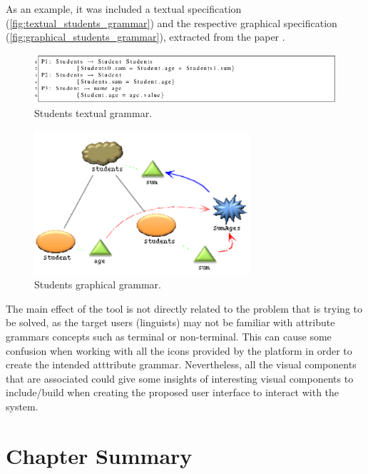 As an example, it was included a textual specification (\autoref{fig:textual_students_grammar}) 
and the respective graphical specification (\autoref{fig:graphical_students_grammar}), extracted from the paper \cite{oliveira_2009}.
    
\begin{figure}[h]
    \centering
    \includegraphics[width=15cm]{images/textual_students_grammar.png}
    \caption{Students textual grammar.}
    \label{fig:textual_students_grammar}
\end{figure}

\newpage

\begin{figure}[h]
    \centering
    \includegraphics[width=8cm]{images/graphical_students_grammar.png}
    \caption{Students graphical grammar.}
    \label{fig:graphical_students_grammar}
\end{figure}

The main effect of the tool is not directly related to the problem that is trying to be solved, as the target users (linguists) may not be familiar with attribute grammars concepts such as 
terminal or non-terminal.
This can cause some confusion when working with all the icons provided by the platform in order to create the intended atttribute grammar.
Nevertheless, all the visual components that are associated could give some insights of interesting visual components to include/build when creating the proposed user interface to interact with the system.


\section{Chapter Summary} %

